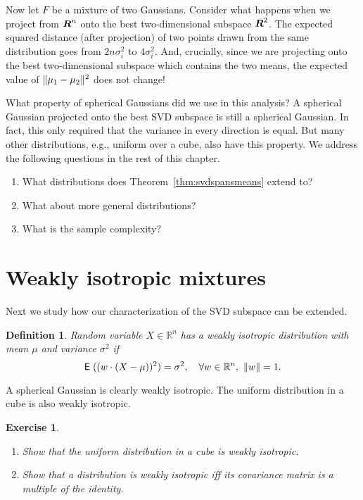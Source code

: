 \documentclass{book}
\newtheorem{definition}[theorem]{Definition}
\newtheorem{exercise}{Exercise}
\numberwithin{exercise}{chapter}
\begin{document}
Now let $F$ be a mixture of two Gaussians.  Consider what
happens when we project from $\mbox{\mbox{\boldmath $R$}}^n$ onto the best two-dimensional
subspace $\mbox{\mbox{\boldmath $R$}}^2$.  The expected squared distance (after projection) of two
points drawn from the same distribution goes from $2n\sigma_i^2$ to
$4\sigma_i^2$.  And, crucially, since we are projecting onto the best
two-dimensional subspace which contains the two means, the expected
value of $\|\mu_1-\mu_2\|^2$ does not change!

What property of spherical Gaussians did we use in this analysis?
A spherical Gaussian projected onto the best SVD subspace is
still a spherical Gaussian.  In fact, this only required that the
variance in every direction is equal.
But many other distributions, e.g., uniform over a cube, also have
this property. We address the following questions in the rest of this
chapter.
\begin{enumerate}
\item What distributions does Theorem~\ref{thm:svdspansmeans}
extend to?
\item What about more general distributions?
\item What is the sample complexity?
\end{enumerate}

\section{Weakly isotropic mixtures}

Next we study how our characterization of the SVD subspace can be extended.

\begin{definition}

Random variable $X\in\mathbb R^n$ has a {\em weakly isotropic} distribution with mean $\mu$ and
variance $\sigma^2$
if
\[\hbox{{\sf E}\;}((w \cdot (X-\mu))^2) =\sigma^2,\quad\forall w\in\mathbb R^n,~\|w\|=1.\]

\end{definition}

 A spherical Gaussian is clearly weakly isotropic. The uniform distribution in a cube is also weakly isotropic.

\begin{exercise}
\begin{enumerate}
\item Show that the uniform distribution in a cube is weakly isotropic.
\item Show that a distribution is weakly isotropic iff its covariance matrix is a multiple
of the identity.
\end{enumerate}
\end{exercise}
\end{document}
